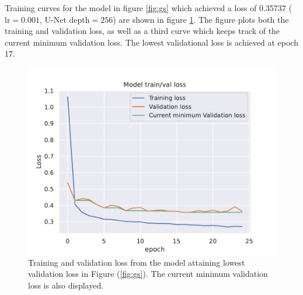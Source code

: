 \documentclass[../main/thesis]{subfiles}
\begin{document}
Training curves for the model in figure \ref{fig:gs} which achieved a loss of 0.35737 ($\text{lr} = 0.001$, $\text{U-Net depth} = 256$) are shown in figure \ref{fig:loss_curve_from_gs}. The figure plots both the training and validation loss, as well as a third curve which keeps track of the current minimum validation loss. The lowest validational loss is achieved at epoch 17. 

\begin{figure}
    \centering
    \includegraphics[width=\textwidth]{loss_curve_best_model_gs}
    \caption{\label{fig:loss_curve_from_gs}Training and validation loss from the model attaining lowest validation loss in Figure (\ref{fig:gs}). The current minimum validation loss is also displayed.}
\end{figure}
\end{document}
